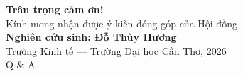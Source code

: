 \documentclass[aspectratio=169,11pt]{beamer}
\begin{document}
\begin{frame}[plain]
  \centering
  \vfill
  {\Huge\textcolor{accent}{\textbf{Trân trọng cảm ơn!}}}\\[1em]
  {\large Kính mong nhận được ý kiến đóng góp của Hội đồng}\\[2em]
  \textbf{Nghiên cứu sinh: Đỗ Thùy Hương}\\
  Trường Kinh tế --- Trường Đại học Cần Thơ, 2026\\[1em]
  {\large\textcolor{accent2}{Q \& A}}
  \vfill
\end{frame}
\end{document}
